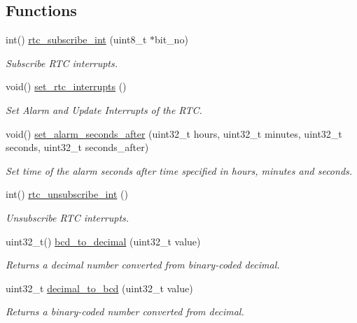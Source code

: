 \subsection*{Functions}
\begin{DoxyCompactItemize}
\item 
int() \hyperlink{group__rtc_ga6bbe679f115cec90d36d50eb2aac1b89}{rtc\+\_\+subscribe\+\_\+int} (uint8\+\_\+t $\ast$bit\+\_\+no)
\begin{DoxyCompactList}\small\item\em Subscribe R\+TC interrupts. \end{DoxyCompactList}\item 
void() \hyperlink{group__rtc_ga298c9a14801d124c4b3a61a7dd0dc5f6}{set\+\_\+rtc\+\_\+interrupts} ()
\begin{DoxyCompactList}\small\item\em Set Alarm and Update Interrupts of the R\+TC. \end{DoxyCompactList}\item 
void() \hyperlink{group__rtc_ga48e4065b3387c3e8c78a1e114c73554e}{set\+\_\+alarm\+\_\+seconds\+\_\+after} (uint32\+\_\+t hours, uint32\+\_\+t minutes, uint32\+\_\+t seconds, uint32\+\_\+t seconds\+\_\+after)
\begin{DoxyCompactList}\small\item\em Set time of the alarm seconds after time specified in hours, minutes and seconds. \end{DoxyCompactList}\item 
int() \hyperlink{group__rtc_ga9d4850bb2a488644672d43287f160622}{rtc\+\_\+unsubscribe\+\_\+int} ()
\begin{DoxyCompactList}\small\item\em Unsubscribe R\+TC interrupts. \end{DoxyCompactList}\item 
uint32\+\_\+t() \hyperlink{group__rtc_ga11fd18e1bdb318485926015c12a8ef15}{bcd\+\_\+to\+\_\+decimal} (uint32\+\_\+t value)
\begin{DoxyCompactList}\small\item\em Returns a decimal number converted from binary-\/coded decimal. \end{DoxyCompactList}\item 
uint32\+\_\+t \hyperlink{group__rtc_ga2e0029ef8fd7e11a5189b0bc4634a2c7}{decimal\+\_\+to\+\_\+bcd} (uint32\+\_\+t value)
\begin{DoxyCompactList}\small\item\em Returns a binary-\/coded number converted from decimal. \end{DoxyCompactList}\item 

\end{DoxyCompactItemize}
